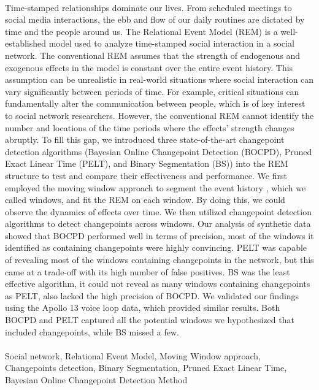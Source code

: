\documentclass[]{interact}
\theoremstyle{plain}%
\theoremstyle{definition}
\theoremstyle{remark}
\begin{document}
	
	
	\vspace*{1cm}
	 \\
	
	\small{Time-stamped relationships dominate our lives. From scheduled meetings to social media interactions, the ebb and flow of our daily routines are dictated by time and the people around us. The Relational Event Model (REM) is a well-established model used to analyze time-stamped social interaction in a social network. The conventional REM assumes that the strength of endogenous and exogenous effects in the model is constant over the entire event history. This assumption can be unrealistic in real-world situations where social interaction can vary significantly between periods of time. For example, critical situations can fundamentally alter the communication between people, which is of key interest to social network researchers. However, the conventional REM cannot identify the number and locations of the time periods where the effects' strength changes abruptly. To fill this gap, we introduced three state-of-the-art changepoint detection algorithms (Bayesian Online Changepoint Detection (BOCPD), Pruned Exact Linear Time (PELT), and Binary Segmentation (BS)) into the REM structure to test and compare their effectiveness and performance. We first employed the moving window approach to segment the event history , which we called windows, and fit the REM on each window. By doing this, we could observe the dynamics of effects over time. We then utilized changepoint detection algorithms to detect changepoints across windows. Our analysis of synthetic data showed that BOCPD performed well in terms of precision, most of the windows it identified as containing changepoints were highly convincing. PELT was capable of revealing most of the windows containing changepoints in the network, but this came at a trade-off with its high number of false positives. BS was the least effective algorithm, it could not reveal as many windows containing changepoints as PELT, also lacked the high precision of BOCPD. We validated our findings using the Apollo 13 voice loop data, which provided similar results. Both BOCPD and PELT captured all the potential windows we hypothesized that included changepoints, while BS missed a few.} \\
	
	 \\
	\small{Social network, Relational Event Model, Moving Window approach, Changepoints detection, Binary Segmentation, Pruned Exact Linear Time, Bayesian Online Changepoint Detection Method} \\
	
\end{document}
